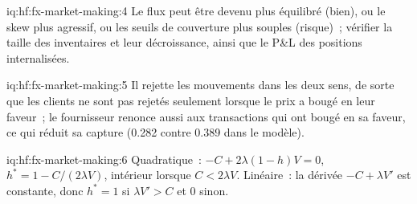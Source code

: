 \begin{solution}{iq:hf:fx-market-making:4}
Le flux peut être devenu plus équilibré (bien), ou le skew plus agressif, ou les seuils de couverture plus souples (risque)~; vérifier la taille des inventaires et leur décroissance,
ainsi que le P\&L des positions internalisées.
\end{solution}

\begin{solution}{iq:hf:fx-market-making:5}
Il rejette les mouvements dans les deux sens, de sorte que les clients ne sont pas rejetés seulement lorsque le prix a bougé en leur faveur~; le fournisseur renonce aussi aux
transactions qui ont bougé en sa faveur, ce qui réduit sa capture (0.282 contre 0.389 dans le modèle).
\end{solution}

\begin{solution}{iq:hf:fx-market-making:6}
Quadratique~: $-C+2\lambda(1-h)V=0$, $h^\ast=1-C/(2\lambda V)$, intérieur lorsque $C<2\lambda V$. Linéaire~: la dérivée $-C+\lambda V'$ est constante, donc
$h^\ast=1$ si $\lambda V'>C$ et $0$ sinon.
\end{solution}
